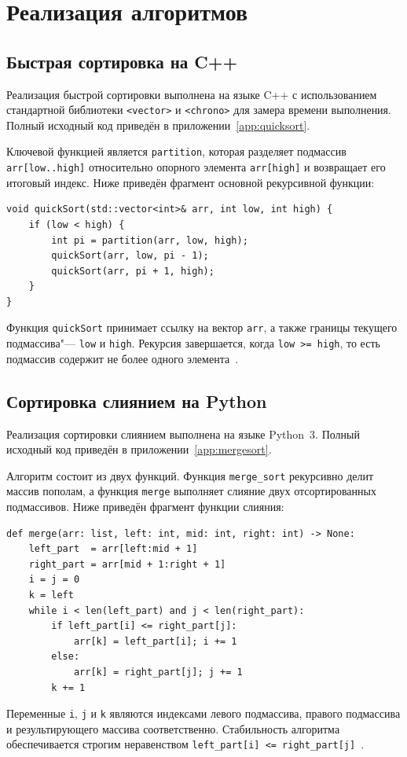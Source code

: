 \section{Реализация алгоритмов}

\subsection{Быстрая сортировка на C++}

Реализация быстрой сортировки выполнена на языке C++ с использованием
стандартной библиотеки \texttt{<vector>} и \texttt{<chrono>} для замера
времени выполнения. Полный исходный код приведён в приложении~\ref{app:quicksort}.

Ключевой функцией является \texttt{partition}, которая разделяет
подмассив \texttt{arr[low..high]} относительно опорного элемента
\texttt{arr[high]} и возвращает его итоговый индекс.
Ниже приведён фрагмент основной рекурсивной функции:

\begin{verbatim}
void quickSort(std::vector<int>& arr, int low, int high) {
    if (low < high) {
        int pi = partition(arr, low, high);
        quickSort(arr, low, pi - 1);
        quickSort(arr, pi + 1, high);
    }
}
\end{verbatim}

Функция \texttt{quickSort} принимает ссылку на вектор \texttt{arr},
а также границы текущего подмассива"--- \texttt{low} и \texttt{high}.
Рекурсия завершается, когда \texttt{low >= high}, то есть подмассив
содержит не более одного элемента~\cite{cppreference}.

\subsection{Сортировка слиянием на Python}

Реализация сортировки слиянием выполнена на языке Python~3. Полный исходный
код приведён в приложении~\ref{app:mergesort}.

Алгоритм состоит из двух функций. Функция \texttt{merge_sort}
рекурсивно делит массив пополам, а функция \texttt{merge}
выполняет слияние двух отсортированных подмассивов. Ниже приведён
фрагмент функции слияния:

\begin{verbatim}
def merge(arr: list, left: int, mid: int, right: int) -> None:
    left_part  = arr[left:mid + 1]
    right_part = arr[mid + 1:right + 1]
    i = j = 0
    k = left
    while i < len(left_part) and j < len(right_part):
        if left_part[i] <= right_part[j]:
            arr[k] = left_part[i]; i += 1
        else:
            arr[k] = right_part[j]; j += 1
        k += 1
\end{verbatim}

Переменные \texttt{i}, \texttt{j} и
\texttt{k} являются индексами левого подмассива,
правого подмассива и результирующего массива соответственно.
Стабильность алгоритма обеспечивается строгим неравенством
\texttt{left_part[i] <= right_part[j]}~\cite{pythondocs}.
